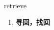 
\begin{frame}
{\huge retrieve}
\begin{center}
\begin{enumerate}\Large
  \item \textbf{寻回，找回}
\end{enumerate}
\end{center}
\end{frame}
